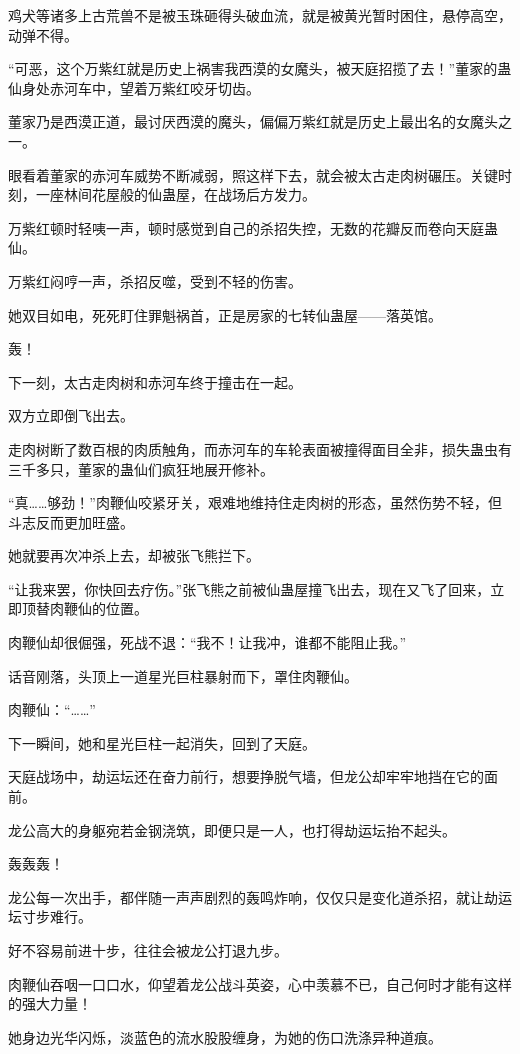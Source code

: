 \begin{this_body}
鸡犬等诸多上古荒兽不是被玉珠砸得头破血流，就是被黄光暂时困住，悬停高空，动弹不得。

“可恶，这个万紫红就是历史上祸害我西漠的女魔头，被天庭招揽了去！”董家的蛊仙身处赤河车中，望着万紫红咬牙切齿。

董家乃是西漠正道，最讨厌西漠的魔头，偏偏万紫红就是历史上最出名的女魔头之一。

眼看着董家的赤河车威势不断减弱，照这样下去，就会被太古走肉树碾压。关键时刻，一座林间花屋般的仙蛊屋，在战场后方发力。

万紫红顿时轻咦一声，顿时感觉到自己的杀招失控，无数的花瓣反而卷向天庭蛊仙。

万紫红闷哼一声，杀招反噬，受到不轻的伤害。

她双目如电，死死盯住罪魁祸首，正是房家的七转仙蛊屋——落英馆。

轰！

下一刻，太古走肉树和赤河车终于撞击在一起。

双方立即倒飞出去。

走肉树断了数百根的肉质触角，而赤河车的车轮表面被撞得面目全非，损失蛊虫有三千多只，董家的蛊仙们疯狂地展开修补。

“真……够劲！”肉鞭仙咬紧牙关，艰难地维持住走肉树的形态，虽然伤势不轻，但斗志反而更加旺盛。

她就要再次冲杀上去，却被张飞熊拦下。

“让我来罢，你快回去疗伤。”张飞熊之前被仙蛊屋撞飞出去，现在又飞了回来，立即顶替肉鞭仙的位置。

肉鞭仙却很倔强，死战不退：“我不！让我冲，谁都不能阻止我。”

话音刚落，头顶上一道星光巨柱暴射而下，罩住肉鞭仙。

肉鞭仙：“……”

下一瞬间，她和星光巨柱一起消失，回到了天庭。

天庭战场中，劫运坛还在奋力前行，想要挣脱气墙，但龙公却牢牢地挡在它的面前。

龙公高大的身躯宛若金钢浇筑，即便只是一人，也打得劫运坛抬不起头。

轰轰轰！

龙公每一次出手，都伴随一声声剧烈的轰鸣炸响，仅仅只是变化道杀招，就让劫运坛寸步难行。

好不容易前进十步，往往会被龙公打退九步。

肉鞭仙吞咽一口口水，仰望着龙公战斗英姿，心中羡慕不已，自己何时才能有这样的强大力量！

她身边光华闪烁，淡蓝色的流水股股缠身，为她的伤口洗涤异种道痕。


\end{this_body}

